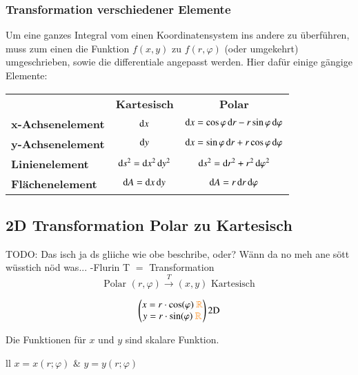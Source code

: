 \subsubsection{Transformation verschiedener Elemente}\label{section:int_bivar:elementre}
Um eine ganzes Integral vom einen Koordinatensystem ins andere zu überführen, muss zum einen die Funktion $ f(x, y) $ zu $ f(r, \varphi) $ (oder umgekehrt) umgeschrieben, sowie die differentiale angepasst werden.
Hier dafür einige gängige Elemente:

\begin{tabular}{l c c}
                         & \bf{Kartesisch}                   & \bf{Polar}                                                       \\
    \bf{x-Achsenelement} & $\mathop{} \! \mathrm{d} x$                         & $\mathop{} \! \mathrm{d} x = \cos \varphi \mathop{} \! \mathrm{d} r - r \sin \varphi \mathop{} \! \mathrm{d} \varphi$  \\
    \bf{y-Achsenelement} & $\mathop{} \! \mathrm{d} y$                         & $\mathop{} \! \mathrm{d} x = \sin \varphi \mathop{} \! \mathrm{d} r + r \cos \varphi \mathop{} \! \mathrm{d} \varphi$  \\
    \bf{Linienelement  } & $\mathop{} \! \mathrm{d} s^2 = \mathop{} \! \mathrm{d} x^2 \mathop{} \! \mathrm{d} y^2$ & $\mathop{} \! \mathrm{d} s^2 = \mathop{} \! \mathrm{d} r^2 + r^2 \mathop{} \! \mathrm{d} \varphi^2$                    \\
    \bf{Flächenelement } & $\mathop{} \! \mathrm{d} A = \mathop{} \! \mathrm{d} x \mathop{} \! \mathrm{d} y$       & $\mathop{} \! \mathrm{d} A = r \mathop{} \! \mathrm{d} r \mathop{} \! \mathrm{d} \varphi$                              \\
\end{tabular}

\subsection{2D Transformation Polar zu Kartesisch}
TODO: Das isch ja ds gliiche wie obe beschribe, oder?
      Wänn da no meh ane sött wüsstich nöd was... -Flurin
T $=$ Transformation
\[
    \text{Polar } (r,\varphi) \xrightarrow{T} (x,y) \text{ Kartesisch}
\]

\[
\begin{pmatrix}
    x=r\cdot\cos(\varphi) \text{ } {\color{orange}\mathbb{R}} \\
    y=r\cdot\sin(\varphi) \text{ } {\color{orange}\mathbb{R}} 
\end{pmatrix}
\text{2D}
\]

Die Funktionen für $x$ und $y$ sind skalare Funktion.

    \begin{ctabular}{ll}
        $x=x(r;\varphi)$ & $ y=y(r;\varphi)$
    \end{ctabular}

